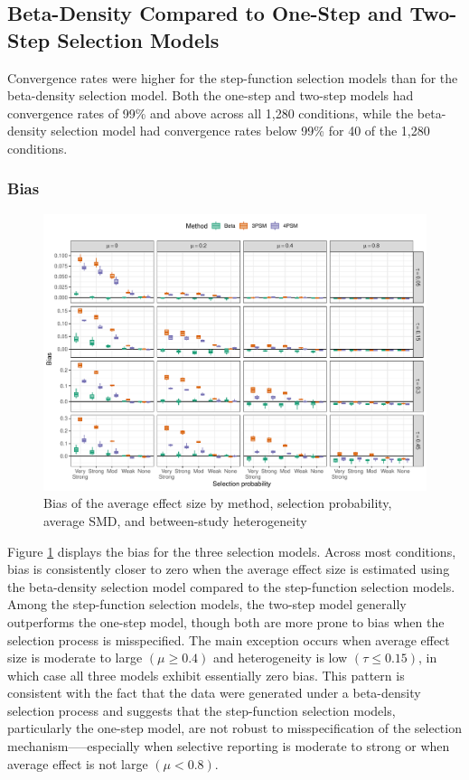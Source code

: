 \documentclass[
  man, donotrepeattitle,floatsintext]{apa7}
\begin{document}
\subsection{Beta-Density Compared to One-Step and Two-Step Selection Models}\label{beta-density-compared-to-one-step-and-two-step-selection-models}

Convergence rates were higher for the step-function selection models than for the beta-density selection model. Both the one-step and two-step models had convergence rates of 99\% and above across all 1,280 conditions, while the beta-density selection model had convergence rates below 99\% for 40 of the 1,280 conditions.

\subsubsection{Bias}\label{bias-1}

\begin{figure}
\includegraphics{beta-function-selection-models-with-dependent-effects_files/figure-latex/mu-bias-miss-1} \caption{Bias of the average effect size by method, selection probability, average SMD, and between-study heterogeneity}\label{fig:mu-bias-miss}
\end{figure}

Figure \ref{fig:mu-bias-miss} displays the bias for the three selection models. Across most conditions, bias is consistently closer to zero when the average effect size is estimated using the beta-density selection model compared to the step-function selection models. Among the step-function selection models, the two-step model generally outperforms the one-step model, though both are more prone to bias when the selection process is misspecified. The main exception occurs when average effect size is moderate to large \((\mu \geq 0.4)\) and heterogeneity is low \((\tau \leq 0.15)\), in which case all three models exhibit essentially zero bias. This pattern is consistent with the fact that the data were generated under a beta-density selection process and suggests that the step-function selection models, particularly the one-step model, are not robust to misspecification of the selection mechanism-----especially when selective reporting is moderate to strong or when average effect is not large \((\mu < 0.8)\).
\end{document}
